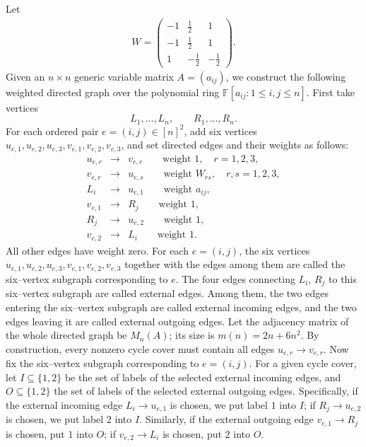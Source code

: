 \documentclass[11pt,a4paper]{article}
\begin{document}
Let
\begin{eqnarray*}
  W=
  \begin{pmatrix}
    -1&\frac12&1\\
    -1&\frac12&1\\
    1&-\frac12&-\frac12
  \end{pmatrix}.
\end{eqnarray*}
Given an $n\times n$ generic variable matrix $A=(a_{ij})$, we construct the following weighted directed graph over the polynomial ring $\mathbb{F}[a_{ij}:1\leq i,j\leq n]$.
First take vertices
\[
  L_1,\ldots,L_n,\qquad R_1,\ldots,R_n.
\]
For each ordered pair $e=(i,j)\in[n]^2$, add six vertices
$u_{e,1},u_{e,2},u_{e,3},v_{e,1},v_{e,2},v_{e,3}$, and set directed edges and their weights as follows:
\begin{eqnarray*}
  u_{e,r}&\longrightarrow&v_{e,r}\qquad \text{weight }1,\quad r=1,2,3,\\
  v_{e,r}&\longrightarrow&u_{e,s}\qquad \text{weight }W_{rs},\quad r,s=1,2,3,\\
  L_i&\longrightarrow&u_{e,1}\qquad \text{weight }a_{ij},\\
  v_{e,1}&\longrightarrow&R_j\qquad \text{weight }1,\\
  R_j&\longrightarrow&u_{e,2}\qquad \text{weight }1,\\
  v_{e,2}&\longrightarrow&L_i\qquad \text{weight }1.
\end{eqnarray*}
All other edges have weight zero. For each $e=(i,j)$, the six vertices
$u_{e,1},u_{e,2},u_{e,3},v_{e,1},v_{e,2},v_{e,3}$ together with the edges among them are called the six–vertex subgraph corresponding to $e$. The four edges connecting $L_i$, $R_j$ to this six–vertex subgraph are called external edges. Among them, the two edges entering the six–vertex subgraph are called external incoming edges, and the two edges leaving it are called external outgoing edges. Let the adjacency matrix of the whole directed graph be $M_n(A)$; its size is
$m(n)=2n+6n^2$. By construction, every nonzero cycle cover must contain all edges
$u_{e,r}\longrightarrow v_{e,r}$. Now fix the six–vertex subgraph corresponding to $e=(i,j)$. For a given cycle cover, let
$I\subseteq\{1,2\}$ be the set of labels of the selected external incoming edges, and $O\subseteq\{1,2\}$ the set of labels of the selected external outgoing edges. Specifically, if the external incoming edge $L_i\to u_{e,1}$ is chosen, we put label $1$ into $I$;
if $R_j\to u_{e,2}$ is chosen, we put label $2$ into $I$. Similarly, if the external outgoing edge $v_{e,1}\to R_j$ is chosen, put $1$ into $O$; if $v_{e,2}\to L_i$ is chosen, put $2$ into $O$.
\end{document}
